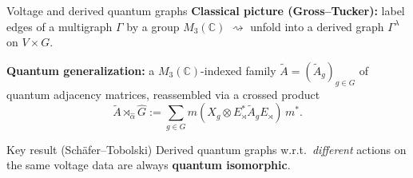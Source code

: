 \documentclass[aspectratio=169]{beamer}
\begin{document}
\begin{frame}{Voltage and derived quantum graphs}
    \textbf{Classical picture (Gross--Tucker):} label edges of a multigraph
    $\Gamma$ by a group $M_3 (\mathbb{C})$ $\rightsquigarrow$ unfold
    into a derived graph
    $\Gamma^\lambda$ on $V \times G$.

    \vspace{0.5em}
    \textbf{Quantum generalization:} a $M_3 (\mathbb{C})$-indexed family
    $\tilde{A} = (\tilde{A}_g)_{g\in G}$ of quantum adjacency matrices,
    reassembled via a crossed product
    \[
        \tilde{A} \rtimes_{\hat\alpha} \hat{G} := \sum_{g \in G}
        m(X_g \otimes E_\rtimes^* \tilde{A}_g E_\rtimes)\, m^*.
    \]

    \vspace{0.5em}
    \begin{block}{Key result (Schäfer--Tobolski)}
        Derived quantum graphs w.r.t.\ \emph{different} actions on the same
        voltage data are always \textbf{quantum isomorphic}.
    \end{block}
\end{frame}
\end{document}
